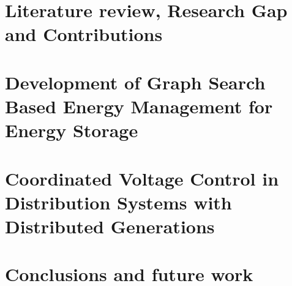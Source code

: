 \documentclass[11pt,expanded,copyright]{fsuthesis}
\begin{document}
\chapter{Literature review, Research Gap and Contributions}
\label{TH_LR}


\chapter{Development of Graph Search Based Energy Management for Energy Storage} \label{A8_cahp}



\chapter{Coordinated Voltage Control in Distribution
Systems with Distributed Generations} \label{CVC}




\chapter{Conclusions and future work}



\end{document}
